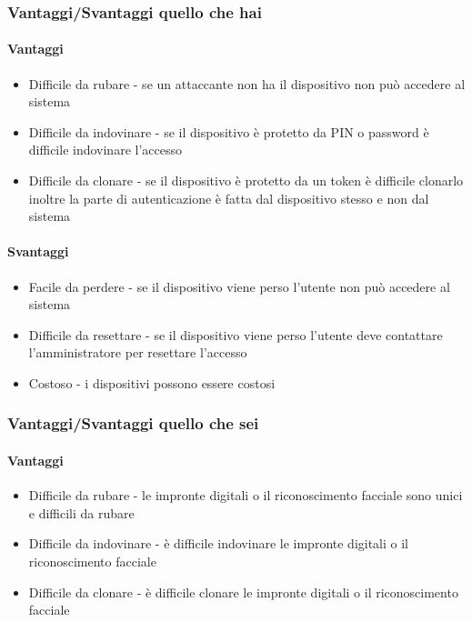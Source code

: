         \subsubsection{Vantaggi/Svantaggi quello che hai}
            \paragraph{Vantaggi}
                \begin{itemize}
                    \item Difficile da rubare - se un attaccante non ha il dispositivo non può accedere al sistema
                    \item Difficile da indovinare - se il dispositivo è protetto da PIN o password è difficile indovinare l'accesso
                    \item Difficile da clonare - se il dispositivo è protetto da un token è difficile clonarlo inoltre la parte di autenticazione è fatta dal dispositivo stesso e non dal sistema
                \end{itemize}
            \paragraph{Svantaggi}
                \begin{itemize}
                    \item Facile da perdere - se il dispositivo viene perso l'utente non può accedere al sistema
                    \item Difficile da resettare - se il dispositivo viene perso l'utente deve contattare l'amministratore per resettare l'accesso
                    \item Costoso - i dispositivi possono essere costosi 
                \end{itemize}
        \subsubsection{Vantaggi/Svantaggi quello che sei}
            \paragraph{Vantaggi}
                \begin{itemize}
                    \item Difficile da rubare - le impronte digitali o il riconoscimento facciale sono unici e difficili da rubare
                    \item Difficile da indovinare - è difficile indovinare le impronte digitali o il riconoscimento facciale
                    \item Difficile da clonare - è difficile clonare le impronte digitali o il riconoscimento facciale
                \end{itemize}
